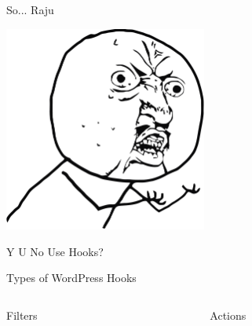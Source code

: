 \documentclass[10pt]{beamer}
\begin{document}
    \begin{frame}
        \begin{center}
            \begin{Huge}
                So... Raju
            \end{Huge}

            \includegraphics[width=0.5\textwidth]{images/rashid}

            \begin{Huge}
                Y U No Use Hooks?
            \end{Huge}
        \end{center}
    \end{frame}

    \begin{frame}{Types of WordPress Hooks}
        \begin{columns}
            \begin{column}{0.5\textwidth}
                \begin{center}
                    \begin{Huge}
                        Filters
                    \end{Huge}
                \end{center}
            \end{column}
            \begin{column}{0.5\textwidth}
                \begin{center}
                    \begin{Huge}
                        Actions
                    \end{Huge}
                \end{center}
            \end{column}
        \end{columns}
    \end{frame}
\end{document}
